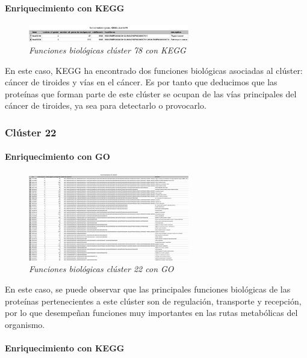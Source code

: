\paragraph{Enriquecimiento con KEGG}

\begin{figure}
	\centering
	\includegraphics[width=70mm,scale=1.2]{figures/cluster78_KEGG.png}
	\caption{\textit{Funciones biológicas clúster 78 con KEGG}}
\end{figure}

En este caso, KEGG ha encontrado dos funciones biológicas asociadas al clúster: cáncer de tiroides y vías en el cáncer. Es por tanto que deducimos que las proteínas que forman parte de este clúster se ocupan de las vías principales del cáncer de tiroides, ya sea para detectarlo o provocarlo.

\subsubsection{Clúster 22}

\paragraph{Enriquecimiento con GO}

\begin{figure}
	\centering
	\includegraphics[width=70mm,scale=1.2]{figures/cluster22_GO.png}
	\caption{\textit{Funciones biológicas clúster 22 con GO}}
\end{figure}

En este caso, se puede observar que las principales funciones biológicas de las proteínas pertenecientes a este clúster son de regulación, transporte y recepción, por lo que desempeñan funciones muy importantes en las rutas metabólicas del organismo. 

\paragraph{Enriquecimiento con KEGG}

